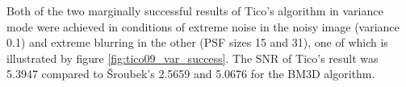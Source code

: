\documentclass[12pt,notitlepage]{report}
\begin{document}
Both of the two marginally successful results of Tico's algorithm in variance mode were achieved in conditions of extreme noise in the noisy image (variance 0.1) and extreme blurring in the other (PSF sizes 15 and 31), one of which is illustrated by figure \ref{fig:tico09_var_success}. The SNR of Tico's result was 5.3947 compared to Šroubek's 2.5659 and 5.0676 for the BM3D algorithm. 

\end{document}
